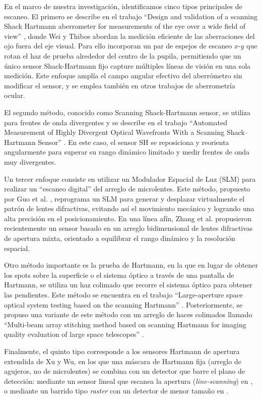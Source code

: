 \documentclass[letterpaper,12pt,oneside]{book}
\begin{document}
En el marco de nuestra investigación, identificamos cinco tipos principales de escaneo. El
primero se describe en el trabajo ``Design and validation of a scanning Shack Hartmann
aberrometer for measurements of the eye over a wide field of view''
\cite{ScanningAberrometer}, donde Wei y Thibos abordan la medición eficiente de las
aberraciones del ojo fuera del eje visual. Para ello incorporan un par de espejos de
escaneo $x$-$y$ que rotan el haz de prueba alrededor del centro de la pupila, permitiendo
que un único sensor Shack-Hartmann fijo capture múltiples líneas de visión en una sola
medición. Este enfoque amplía el campo angular efectivo del aberrómetro sin modificar el
sensor, y se emplea también en otros trabajos de aberrometría ocular.

El segundo método, conocido como Scanning Shack-Hartmann sensor, se utiliza para frentes
de onda divergentes y se describe en el trabajo ``Automated Measurement of Highly
Divergent Optical Wavefronts With a Scanning Shack–Hartmann Sensor''
\cite{FuerstDivergent}. En este caso, el sensor SH se reposiciona y reorienta angularmente
para superar su rango dinámico limitado y medir frentes de onda muy divergentes.

Un tercer enfoque consiste en utilizar un Modulador Espacial de Luz (SLM) para realizar un
``escaneo digital'' del arreglo de microlentes. Este método, propuesto por Guo et al.
\cite{GuoScanning}, reprograma un SLM para generar y desplazar virtualmente el patrón de
lentes difractivas, evitando así el movimiento mecánico y logrando una alta precisión en
el posicionamiento.  En una línea afín, Zhang et al. \cite{ZhangSLM} propusieron
recientemente un sensor basado en un arreglo bidimensional de lentes difractivas de
apertura mixta, orientado a equilibrar el rango dinámico y la resolución espacial.

Otro método importante es la prueba de Hartmann, en la que en lugar de obtener los spots
sobre la superficie o el sistema óptico a través de una pantalla de Hartmann, se utiliza
un haz colimado que recorre el sistema óptico para obtener las pendientes. Este método se
encuentra en el trabajo ``Large-aperture space optical system testing based on the
scanning Hartmann'' \cite{Largespaceopticalsystemtesting,LiuScanning}. Posteriormente, se
propuso una variante de este método con un arreglo de haces colimados llamado ``Multi-beam
array stitching method based on scanning Hartmann for imaging quality evaluation of large
space telescopes'' \cite{WeiMultibeam}.

Finalmente, el quinto tipo corresponde a los sensores Hartmann de apertura extendida de Xu
y Wu, en los que una máscara de Hartmann fija (arreglo de agujeros, no de microlentes) se
combina con un detector que barre el plano de detección: mediante un sensor lineal que
escanea la apertura (\textit{line-scanning}) en \cite{XuExtended}, o mediante un barrido
tipo \textit{raster} con un detector de menor tamaño en \cite{XuRaster}.
\end{document}
